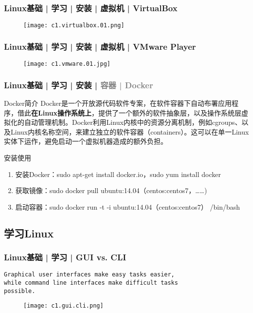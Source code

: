 \begin{frame}
  \frametitle{Linux基础 | 学习 | 安装 | 虚拟机 | VirtualBox}
  \begin{figure}
    \centering
    \texttt{[image: c1.virtualbox.01.png]}
  \end{figure}
\end{frame}

\begin{frame}
  \frametitle{Linux基础 | 学习 | 安装 | 虚拟机 | VMware Player}
  \begin{figure}
    \centering
    \texttt{[image: c1.vmware.01.jpg]}
  \end{figure}
\end{frame}

\begin{frame}
  \frametitle{Linux基础 | 学习 | 安装 | \textcolor{gray}{容器 | Docker}}
  \begin{block}{Docker简介}
    Docker是一个开放源代码软件专案，在软件容器下自动布署应用程序，借此\textbf{在Linux操作系统上}，提供了一个额外的软件抽象层，以及操作系统层虚拟化的自动管理机制。Docker利用Linux内核中的资源分离机制，例如cgroups、以及Linux内核名称空间，来建立独立的软件容器（containers）。这可以在单一Linux实体下运作，避免启动一个虚拟机器造成的额外负担。
  \end{block}
  \pause
  \begin{block}{安装使用}
    \begin{enumerate}
      \item 安装Docker：sudo apt-get install docker.io，sudo yum install docker
      \item 获取镜像：sudo docker pull ubuntu:14.04（centos:centos7，……)
      \item 启动容器：sudo docker run -t -i ubuntu:14.04（centos:centos7） /bin/bash
    \end{enumerate}
  \end{block}
\end{frame}

\subsection{学习Linux}
\begin{frame}[fragile]
  \frametitle{Linux基础 | 学习 | GUI vs. CLI}
  \begin{verbatim}
Graphical user interfaces make easy tasks easier, 
while command line interfaces make difficult tasks
possible.
  \end{verbatim}
  \vspace{-0.8cm}
  \begin{figure}
    \centering
    \texttt{[image: c1.gui.cli.png]}
  \end{figure}
\end{frame}

